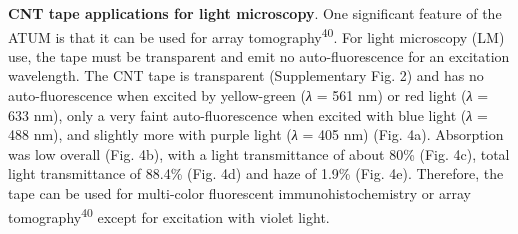 \documentclass{article}
\begin{document}
\textbf{CNT tape applications for light microscopy}. One significant feature of the ATUM is that it can be used for array tomography\textsuperscript{40}. For light microscopy (LM) use, the tape must be transparent and emit no auto-fluorescence for an excitation 
wavelength. The CNT tape is transparent (Supplementary Fig. 2) and has no auto-fluorescence when excited by yellow-green (\emph{λ} = 561 nm) or red light (\emph{λ} = 633 nm), only a very faint auto-fluorescence when excited with blue light (\emph{λ} = 488 nm), and slightly more with purple light (\emph{λ} = 405 nm) (Fig. 4a). Absorption was low overall (Fig. 4b), with a light transmittance of about 80\% (Fig. 4c), total light transmittance of 88.4\% (Fig. 4d) and haze of 1.9\% (Fig. 4e). Therefore, the tape can be used for multi-color fluorescent immunohistochemistry or array tomography\textsuperscript{40} except for excitation with violet light.
\end{document}
